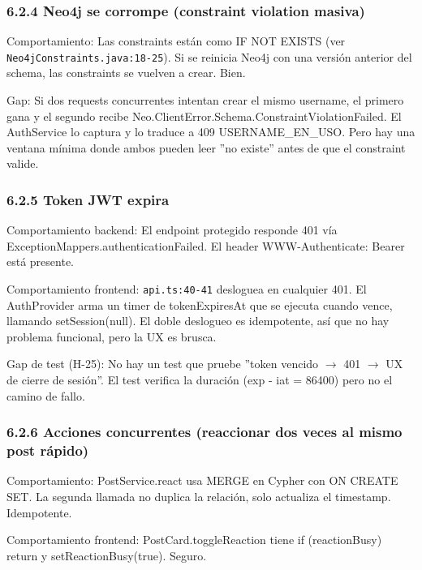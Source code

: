 \documentclass[10pt,a4paper]{article}
\newcommand{\code}[1]{\nolinkurl{#1}}
\begin{document}
\subsubsection{6.2.4 Neo4j se corrompe (constraint violation masiva)}
Comportamiento: Las constraints están como IF NOT EXISTS (ver \code{Neo4jConstraints.java:18-25}). Si se reinicia Neo4j con una versión anterior del schema, las constraints se vuelven a crear. Bien.\par\vspace{0.4em}
Gap: Si dos requests concurrentes intentan crear el mismo username, el primero gana y el segundo recibe Neo.ClientError.Schema.ConstraintViolationFailed. El AuthService lo captura y lo traduce a 409 USERNAME\_EN\_USO. Pero hay una ventana mínima donde ambos pueden leer ''no existe'' antes de que el constraint valide.\par\vspace{0.4em}
\subsubsection{6.2.5 Token JWT expira}
Comportamiento backend: El endpoint protegido responde 401 vía ExceptionMappers.authenticationFailed. El header WWW-Authenticate: Bearer está presente.\par\vspace{0.4em}
Comportamiento frontend: \code{api.ts:40-41} desloguea en cualquier 401. El AuthProvider arma un timer de tokenExpiresAt que se ejecuta cuando vence, llamando setSession(null). El doble deslogueo es idempotente, así que no hay problema funcional, pero la UX es brusca.\par\vspace{0.4em}
Gap de test (H-25): No hay un test que pruebe ''token vencido $\rightarrow$ 401 $\rightarrow$ UX de cierre de sesión''. El test verifica la duración (exp - iat = 86400) pero no el camino de fallo.\par\vspace{0.4em}
\subsubsection{6.2.6 Acciones concurrentes (reaccionar dos veces al mismo post rápido)}
Comportamiento: PostService.react usa MERGE en Cypher con ON CREATE SET. La segunda llamada no duplica la relación, solo actualiza el timestamp. Idempotente.\par\vspace{0.4em}
Comportamiento frontend: PostCard.toggleReaction tiene if (reactionBusy) return y setReactionBusy(true). Seguro.\par\vspace{0.4em}
\end{document}
